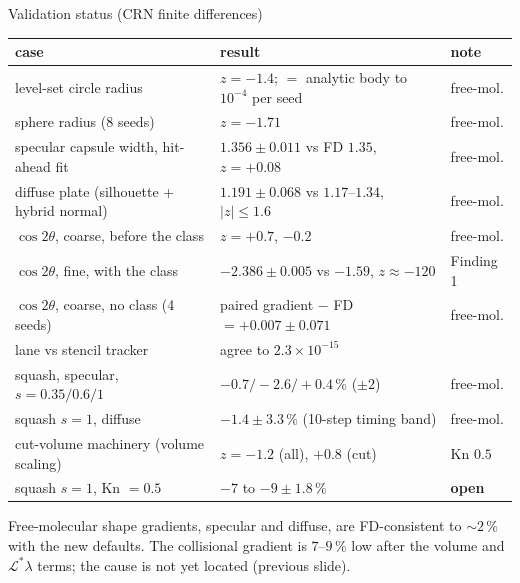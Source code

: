\documentclass[10pt,aspectratio=169]{beamer}
\begin{document}
\begin{frame}{Validation status (CRN finite differences)}
\footnotesize
\begin{tabular}{@{}lll@{}}
\toprule
case & result & note\\
\midrule
level-set circle radius & $z=-1.4$; $=$ analytic body to $10^{-4}$ per seed & free-mol.\\
sphere radius (8 seeds) & $z=-1.71$ & free-mol.\\
specular capsule width, hit-ahead fit & $1.356\pm0.011$ vs FD $1.35$, $z=+0.08$ & free-mol.\\
diffuse plate (silhouette + hybrid normal) & $1.191\pm0.068$ vs $1.17$--$1.34$, $|z|\le1.6$ & free-mol.\\
$\cos2\theta$, coarse, before the class & $z=+0.7$, $-0.2$ & free-mol.\\
$\cos2\theta$, fine, with the class & $-2.386\pm0.005$ vs $-1.59$, $z\approx-120$ & Finding 1\\
$\cos2\theta$, coarse, no class (4 seeds) & paired gradient $-$ FD $= +0.007\pm0.071$ & free-mol.\\
lane vs stencil tracker & agree to $2.3\times10^{-15}$ & \\
\midrule
squash, specular, $s = 0.35/0.6/1$ & $-0.7/-2.6/+0.4\,\%$ ($\pm2$) & free-mol.\\
squash $s = 1$, diffuse & $-1.4\pm3.3\,\%$ (10-step timing band) & free-mol.\\
cut-volume machinery (volume scaling) & $z = -1.2$ (all), $+0.8$ (cut) & Kn $0.5$\\
squash $s = 1$, Kn $=0.5$ & $-7$ to $-9\pm1.8\,\%$ & \textbf{open}\\
\bottomrule
\end{tabular}

\medskip
Free-molecular shape gradients, specular and diffuse, are FD-consistent to $\sim2\,\%$ with
the new defaults.  The collisional gradient is $7$--$9\,\%$ low after the volume and
$\mathcal L^*\lambda$ terms; the cause is not yet located (previous slide).
\end{frame}
\end{document}

